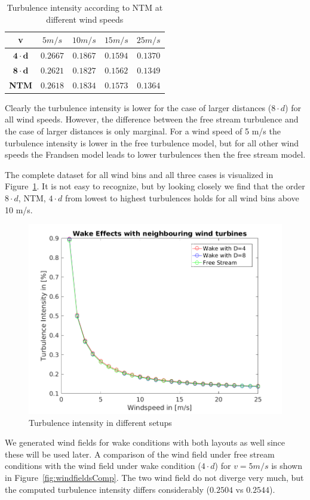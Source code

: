 \documentclass[10pt]{article}
\begin{document}
\begin{table}[H]
\centering
\begin{tabular}{| c | c | c | c | c |}
\hline
\textbf{v} & $5m/s$ & $10m/s$ & $15m/s$ & $25m/s$ \\
\hline
$\mathbf{4 \cdot d}$ & $0.2667$ & $0.1867$ & $0.1594$ & $ 0.1370$	\\
\hline
$\mathbf{8 \cdot d}$ & $0.2621$ & $0.1827$ & $0.1562$ & $0.1349$	\\
\hline
\textbf{NTM} & $0.2618$ & $0.1834$ & $0.1573$ & $0.1364$	\\
\hline
\end{tabular}
\caption{Turbulence intensity according to NTM at different wind speeds}
\label{tab:waketable}
\end{table}

Clearly the turbulence intensity is lower for the case of larger distances ($8 \cdot d$) for all wind speeds. However, the difference between the free stream turbulence and the case of larger distances is only marginal. For a wind speed of 5 m/s the turbulence intensity is lower in the free turbulence model, but for all other wind speeds the Frandsen model leads to lower turbulences then the free stream model. 

The complete dataset for all wind bins and all three cases is visualized in Figure~\ref{fig:turbintense}. It is not easy to recognize, but by looking closely we find that the order $8 \cdot d$, NTM, $4 \cdot d$ from lowest to highest turbulences holds for all wind bins above 10 m/s.

\begin{figure}[H]
\centering
\includegraphics[width=0.5\linewidth]{../CIP_5/CIP_Tutorial_5_-_Windfield_and_wake_simulation/wake_effects_5.png}
\caption{Turbulence intensity in different setups}
\label{fig:turbintense}
\end{figure} 

We generated wind fields for wake conditions with both layouts as well since these will be used later. 
A comparison of the wind field under free stream conditions with the wind field under wake condition ($4\cdot d$) for $v=5m/s$ is shown in Figure~\ref{fig:windfieldsComp}. The two wind field do not diverge very much, but the computed turbulence intensity differs considerably ($0.2504$ vs $0.2544$).
\end{document}
